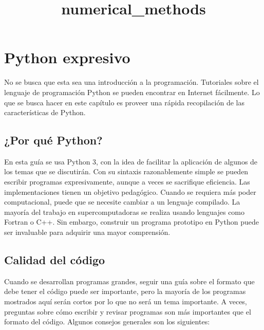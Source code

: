\documentclass[11pt]{article}
\title{numerical\_methods}
\begin{document}
    
    
    \maketitle
    
    

    
    \hypertarget{python-expresivo}{%
\section{Python expresivo}\label{python-expresivo}}

No se busca que esta sea una introducción a la programación. Tutoriales
sobre el lenguaje de programación Python se pueden encontrar en Internet
fácilmente. Lo que se busca hacer en este capítulo es proveer una rápida
recopilación de las características de Python.

\hypertarget{por-quuxe9-python}{%
\subsection{¿Por qué Python?}\label{por-quuxe9-python}}

En esta guía se usa Python 3, con la idea de facilitar la aplicación de
algunos de los temas que se discutirán. Con su sintaxis razonablemente
simple se pueden escribir programas expresivamente, aunque a veces se
sacrifique eficiencia. Las implementaciones tienen un objetivo
pedagógico. Cuando se requiera más poder computacional, puede que se
necesite cambiar a un lenguaje compilado. La mayoría del trabajo en
supercomputadoras se realiza usando lenguajes como Fortran o C++. Sin
embargo, construir un programa prototipo en Python puede ser invaluable
para adquirir una mayor comprensión.

\hypertarget{calidad-del-cuxf3digo}{%
\subsection{Calidad del código}\label{calidad-del-cuxf3digo}}

Cuando se desarrollan programas grandes, seguir una guía sobre el
formato que debe tener el código puede ser importante, pero la mayoría
de los programas mostrados aquí serán cortos por lo que no será un tema
importante. A veces, preguntas sobre cómo escribir y revisar programas
son más importantes que el formato del código. Algunos consejos
generales son los siguientes:
\end{document}
